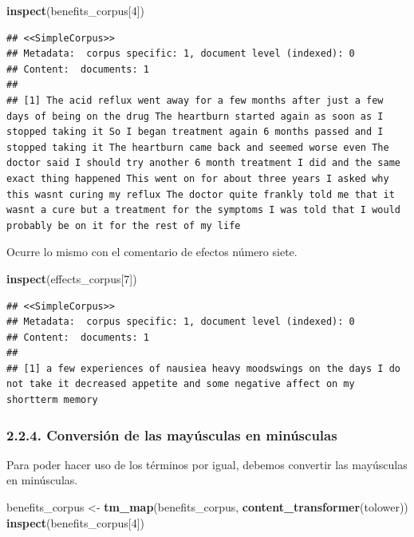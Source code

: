 \documentclass[spanish,]{article}
\newenvironment{Shaded}{\begin{snugshade}}{\end{snugshade}}
\newcommand{\DecValTok}[1]{\textcolor[rgb]{0.00,0.00,0.81}{#1}}
\newcommand{\KeywordTok}[1]{\textcolor[rgb]{0.13,0.29,0.53}{\textbf{#1}}}
\newcommand{\NormalTok}[1]{#1}
\newcommand{\StringTok}[1]{\textcolor[rgb]{0.31,0.60,0.02}{#1}}
\begin{document}
\begin{Shaded}
\begin{Highlighting}[]
\KeywordTok{inspect}\NormalTok{(benefits_corpus[}\DecValTok{4}\NormalTok{])}
\end{Highlighting}
\end{Shaded}

\begin{verbatim}
## <<SimpleCorpus>>
## Metadata:  corpus specific: 1, document level (indexed): 0
## Content:  documents: 1
## 
## [1] The acid reflux went away for a few months after just a few days of being on the drug The heartburn started again as soon as I stopped taking it So I began treatment again 6 months passed and I stopped taking it The heartburn came back and seemed worse even The doctor said I should try another 6 month treatment I did and the same exact thing happened This went on for about three years I asked why this wasnt curing my reflux The doctor quite frankly told me that it wasnt a cure but a treatment for the symptoms I was told that I would probably be on it for the rest of my life
\end{verbatim}

Ocurre lo mismo con el comentario de efectos número siete.

\begin{Shaded}
\begin{Highlighting}[]
\KeywordTok{inspect}\NormalTok{(effects_corpus[}\DecValTok{7}\NormalTok{])}
\end{Highlighting}
\end{Shaded}

\begin{verbatim}
## <<SimpleCorpus>>
## Metadata:  corpus specific: 1, document level (indexed): 0
## Content:  documents: 1
## 
## [1] a few experiences of nausiea heavy moodswings on the days I do not take it decreased appetite and some negative affect on my shortterm memory
\end{verbatim}

\hypertarget{conversion-de-las-mayusculas-en-minusculas}{%
\subsubsection{2.2.4. Conversión de las mayúsculas en
minúsculas}\label{conversion-de-las-mayusculas-en-minusculas}}

Para poder hacer uso de los términos por igual, debemos convertir las
mayúsculas en minúsculas.

\begin{Shaded}
\begin{Highlighting}[]
\NormalTok{benefits_corpus <-}\StringTok{ }\KeywordTok{tm_map}\NormalTok{(benefits_corpus, }\KeywordTok{content_transformer}\NormalTok{(tolower))}
\KeywordTok{inspect}\NormalTok{(benefits_corpus[}\DecValTok{4}\NormalTok{])}
\end{Highlighting}
\end{Shaded}
\end{document}
